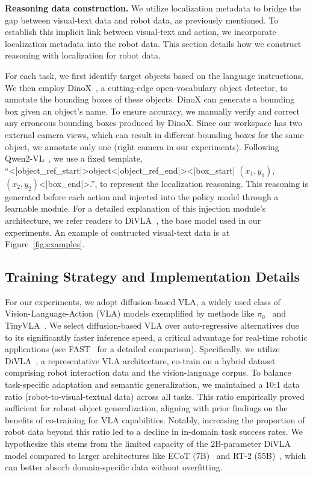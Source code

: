 \noindent
\textbf{Reasoning data construction.}
We utilize localization metadata to bridge the gap between visual-text data and robot data, as previously mentioned. To establish this implicit link between visual-text and action, we incorporate localization metadata into the robot data. This section details how we construct reasoning with localization for robot data.

For each task, we first identify target objects based on the language instructions. We then employ DinoX~\cite{ren2024dino}, a cutting-edge open-vocabulary object detector, to annotate the bounding boxes of these objects. DinoX can generate a bounding box given an object's name. To ensure accuracy, we manually verify and correct any erroneous bounding boxes produced by DinoX. Since our workspace has two external camera views, which can result in different bounding boxes for the same object, we annotate only one (right camera in our experiments). Following Qwen2-VL~\cite{wang2024qwen2}, we use a fixed template, ``<|object\_ref\_start|>{object}<|object\_ref\_end|><|box\_start|
$(x_{1}, y_{1})$,$(x_{2}, y_{2})$<|box\_end|>.'', to represent the localization reasoning. 
This reasoning is generated before each action and injected into the policy model through a learnable module. For a detailed explanation of this injection module's architecture, we refer readers to DiVLA~\cite{wen2024diffusionvla}, the base model used in our experiments. An example of contructed visual-text data is at Figure~\ref{fig:examples}.


\subsection{Training Strategy and Implementation Details}
For our experiments, we adopt diffusion-based VLA, a widely used class of Vision-Language-Action (VLA) models exemplified by methods like $\pi_{0}$~\cite{[pi0} and TinyVLA~\cite{wen2024tinyvla}. We select diffusion-based VLA over auto-regressive alternatives due to its significantly faster inference speed, a critical advantage for real-time robotic applications (see FAST~\cite{pertsch2025fast} for a detailed comparison). Specifically, we utilize DiVLA~\cite{wen2024diffusionvla}, a representative VLA architecture, co-train on a hybrid dataset comprising robot interaction data and the vision-language corpus. To balance task-specific adaptation and semantic generalization, we maintained a 10:1 data ratio (robot-to-visual-textual data) across all tasks. This ratio empirically proved sufficient for robust object generalization, aligning with prior findings on the benefits of co-training for VLA capabilities. Notably, increasing the proportion of robot data beyond this ratio led to a decline in in-domain task success rates. We hypothesize this stems from the limited capacity of the 2B-parameter DiVLA model compared to larger architectures like ECoT (7B)~\cite{ecot} and RT-2 (55B)~\cite{rt-2}, which can better absorb domain-specific data without overfitting.